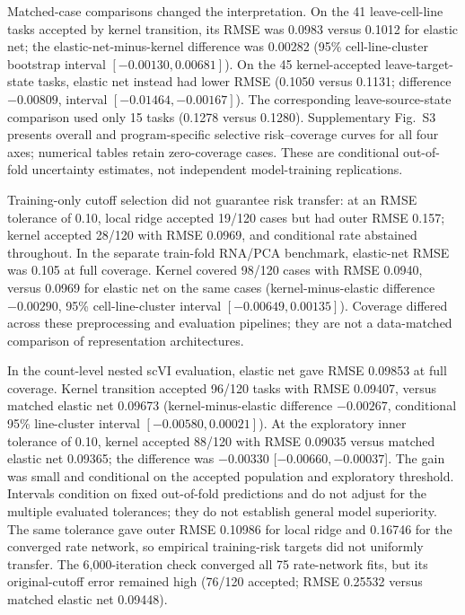\documentclass[a4paper,fleqn]{cas-sc}
\makeatletter
\DeclareRobustCommand{\rev}[1]{{\color{red}\def\@citecolor{black}\def\@linkcolor{red}\def\@urlcolor{red}#1}}
\makeatother
\begin{document}
Matched-case comparisons changed the interpretation. On the 41 leave-cell-line tasks accepted by kernel transition, its RMSE was 0.0983 versus 0.1012 for elastic net; the elastic-net-minus-kernel difference was 0.00282 (95\% cell-line-cluster bootstrap interval $[-0.00130,0.00681]$). On the 45 kernel-accepted leave-target-state tasks, elastic net instead had lower RMSE (0.1050 versus 0.1131; difference $-0.00809$, interval $[-0.01464,-0.00167]$). The corresponding leave-source-state comparison used only 15 tasks (0.1278 versus 0.1280). Supplementary Fig.~S3 presents overall and program-specific selective risk--coverage curves for all four axes; numerical tables retain zero-coverage cases. These are conditional out-of-fold uncertainty estimates, not independent model-training replications.

Training-only cutoff selection did not guarantee risk transfer: at an RMSE tolerance of 0.10, local ridge accepted 19/120 cases but had outer RMSE 0.157; kernel accepted 28/120 with RMSE 0.0969, and conditional rate abstained throughout. In the separate train-fold RNA/PCA benchmark, elastic-net RMSE was 0.105 at full coverage. Kernel covered 98/120 cases with RMSE 0.0940, versus 0.0969 for elastic net on the same cases (kernel-minus-elastic difference $-0.00290$, 95\% cell-line-cluster interval $[-0.00649,0.00135]$). Coverage differed across these preprocessing and evaluation pipelines; they are not a data-matched comparison of representation architectures.

In the count-level nested scVI evaluation, elastic net gave RMSE 0.09853 at full coverage. Kernel transition accepted 96/120 tasks with RMSE 0.09407, versus matched elastic net 0.09673 (kernel-minus-elastic difference $-0.00267$, conditional 95\% line-cluster interval $[-0.00580,0.00021]$). At the exploratory inner tolerance of 0.10, kernel accepted 88/120 with RMSE 0.09035 versus matched elastic net 0.09365; the difference was $-0.00330$ [$-0.00660,-0.00037$]. \rev{The gain was small and conditional on the accepted population and exploratory threshold.} \rev{Intervals condition on fixed out-of-fold predictions and do not adjust for the multiple evaluated tolerances; they do not establish general model superiority.} The same tolerance gave outer RMSE 0.10986 for local ridge and 0.16746 for the converged rate network, so empirical training-risk targets did not uniformly transfer. The 6,000-iteration check converged all 75 rate-network fits, but its original-cutoff error remained high (76/120 accepted; RMSE 0.25532 versus matched elastic net 0.09448).
\end{document}
